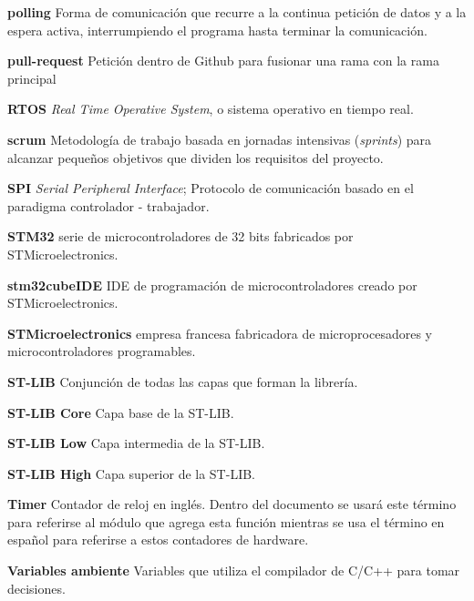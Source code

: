 \documentclass{report}
\begin{document}
\par \vspace{0.2 cm}
\textbf{polling} Forma de comunicación que recurre a la continua petición de datos y a la espera activa, interrumpiendo el programa hasta terminar la comunicación.
\par \vspace{0.2 cm}
\textbf{pull-request} Petición dentro de Github para fusionar una rama con la rama principal
\par \vspace{0.2 cm}
\textbf{RTOS} \textit{Real Time Operative System}, o sistema operativo en tiempo real.  
\par \vspace{0.2 cm}
\textbf{scrum} Metodología de trabajo basada en jornadas intensivas (\textit{sprints}) para alcanzar pequeños objetivos que dividen los requisitos del proyecto.  
\par \vspace{0.2 cm}
\textbf{SPI} \textit{Serial Peripheral Interface}; Protocolo de comunicación basado en el paradigma controlador - trabajador.
\par \vspace{0.2 cm}
\textbf{STM32} serie de microcontroladores de 32 bits fabricados por STMicroelectronics.
\par \vspace{0.2 cm}
\textbf{stm32cubeIDE} IDE de programación de microcontroladores creado por STMicroelectronics.
\par \vspace{0.2 cm}
\textbf{STMicroelectronics} empresa francesa fabricadora de microprocesadores y microcontroladores programables.
\par \vspace{0.2 cm}
\textbf{ST-LIB} Conjunción de todas las capas que forman la librería.
\par \vspace{0.2 cm}
\textbf{ST-LIB Core} Capa base de la ST-LIB.
\par \vspace{0.2 cm}
\textbf{ST-LIB Low} Capa intermedia de la ST-LIB.
\par \vspace{0.2 cm}
\textbf{ST-LIB High} Capa superior de la ST-LIB.
\par \vspace{0.2 cm}
\textbf{Timer} Contador de reloj en inglés. Dentro del documento se usará este término para referirse al módulo que agrega esta función mientras se usa el término en español para referirse a estos contadores de hardware. 
\par \vspace{0.2 cm}
\textbf{Variables ambiente} Variables que utiliza el compilador de C/C++ para tomar decisiones.
\par \vspace{0.2 cm}
\end{document}
